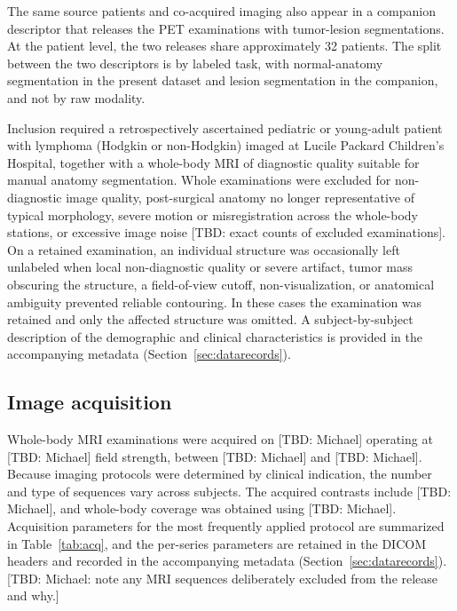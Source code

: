 The same source patients and co-acquired imaging also appear in a companion descriptor that releases the PET examinations with tumor-lesion segmentations.
At the patient level, the two releases share approximately 32 patients.
The split between the two descriptors is by labeled task, with normal-anatomy segmentation in the present dataset and lesion segmentation in the companion, and not by raw modality.

Inclusion required a retrospectively ascertained pediatric or young-adult patient with lymphoma (Hodgkin or non-Hodgkin) imaged at Lucile Packard Children's Hospital, together with a whole-body MRI of diagnostic quality suitable for manual anatomy segmentation.
Whole examinations were excluded for non-diagnostic image quality, post-surgical anatomy no longer representative of typical morphology, severe motion or misregistration across the whole-body stations, or excessive image noise [TBD: exact counts of excluded examinations].
On a retained examination, an individual structure was occasionally left unlabeled when local non-diagnostic quality or severe artifact, tumor mass obscuring the structure, a field-of-view cutoff, non-visualization, or anatomical ambiguity prevented reliable contouring.
In these cases the examination was retained and only the affected structure was omitted.
A subject-by-subject description of the demographic and clinical characteristics is provided in the accompanying metadata (Section~\ref{sec:datarecords}).

\subsection*{Image acquisition}\label{subsec:acquisition}
Whole-body MRI examinations were acquired on [TBD: Michael] operating at [TBD: Michael] field strength, between [TBD: Michael] and [TBD: Michael].
Because imaging protocols were determined by clinical indication, the number and type of sequences vary across subjects.
The acquired contrasts include [TBD: Michael], and whole-body coverage was obtained using [TBD: Michael].
Acquisition parameters for the most frequently applied protocol are summarized in Table~\ref{tab:acq}, and the per-series parameters are retained in the DICOM headers and recorded in the accompanying metadata (Section~\ref{sec:datarecords}).
[TBD: Michael: note any MRI sequences deliberately excluded from the release and why.]

